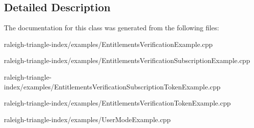 \subsection{Detailed Description}


The documentation for this class was generated from the following files\+:\begin{DoxyCompactItemize}
\item 
raleigh-\/triangle-\/index/examples/Entitlements\+Verification\+Example.\+cpp\item 
raleigh-\/triangle-\/index/examples/Entitlements\+Verification\+Subscription\+Example.\+cpp\item 
raleigh-\/triangle-\/index/examples/Entitlements\+Verification\+Subscription\+Token\+Example.\+cpp\item 
raleigh-\/triangle-\/index/examples/Entitlements\+Verification\+Token\+Example.\+cpp\item 
raleigh-\/triangle-\/index/examples/User\+Mode\+Example.\+cpp\end{DoxyCompactItemize}

